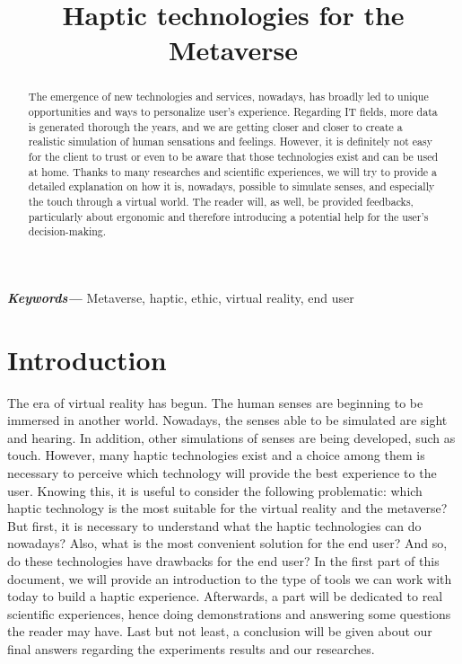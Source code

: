 \documentclass[12pt, a4paper]{article}
\title{Haptic technologies for the Metaverse}
\author{Nathan Poret\\\small{nathan.poret@viacesi.fr}\\\small{Cesi Student FISE SPE INFO
\and {\rm Valentin Pain}\\\small{valentin.pain@viacesi.fr}\\\small{Cesi Student FISE SPE INFO}
\and {\rm Benjamin Brifault}\\\small{benjamin.brifault@viacesi.fr}\\\small{Cesi Student FISE SPE INFO}
\and {\rm Arthur Lecras}\\\small{arthur.lecras@viacesi.fr}\\\small{Cesi Student FISE SPE INFO}
\and {\rm Dove-Steeve Bingo Kpognon}\\\small{dovesteeve.bingokpognon@viacesi.fr}\\\small{Cesi Student FISE SPE INFO}
\and {\rm Pierre Garrido}\\\small{pierre.garrido@viacesi.fr}\\\small{Cesi Student FISE SPE INFO}}}
\providecommand{\keywords}[1]
{
  \small	
  \textbf{\textit{Keywords---}} #1
}
\begin{document}
\maketitle
\begin{multicols}{2}
\begin{abstract}
The emergence of new technologies and services, nowadays, has broadly led to unique opportunities and ways to personalize user's experience. Regarding IT fields, more data is generated thorough the years, and we are getting closer and closer to create a realistic simulation of human sensations and feelings. However, it is definitely not easy for the client to trust or even to be aware that those technologies exist and can be used at home. Thanks to many researches and scientific experiences, we will try to provide a detailed explanation on how it is, nowadays, possible to simulate senses, and especially the touch through a virtual world. The reader will, as well, be provided feedbacks, particularly about ergonomic and therefore introducing a potential help for the user's decision-making. 
\end{abstract}

\keywords{Metaverse, haptic, ethic, virtual reality, end user}

\section{Introduction}

\par The era of virtual reality has begun. The human senses are beginning to be immersed in another world. Nowadays, the senses able to be simulated are sight and hearing. In addition, other simulations of senses are being developed, such as touch. However, many haptic technologies exist and a choice among them is necessary to perceive which technology will provide the best experience to the user. Knowing this, it is useful to consider the following problematic: which haptic technology is the most suitable for the virtual reality and the metaverse? But first, it is necessary to understand what the haptic technologies can do nowadays? Also, what is the most convenient solution for the end user? And so, do these technologies have drawbacks for the end user? In the first part of this document, we will provide an introduction to the type of tools we can work with today to build a haptic experience. Afterwards, a part will be dedicated to real scientific experiences, hence doing demonstrations and answering some questions the reader may have. Last but not least, a conclusion will be given about our final answers regarding the experiments results and our researches.


\end{multicols}
\end{document}
